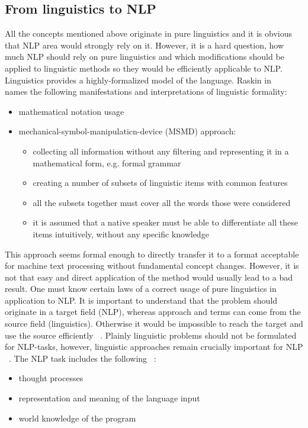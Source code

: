 \subsection{From linguistics to NLP}


All the concepts mentioned above originate in pure linguistics and it is obvious that NLP area would strongly rely on it. However, it is a hard question, how much NLP should rely on pure linguistics and which modifications should be applied to linguistic methods so they would be efficiently applicable to NLP. Linguistics provides a highly-formalized model of the language. Raskin in ~\cite{Raskin} names the following manifestations and interpretations of linguistic formality:

\begin{itemize}
\item mathematical notation usage
\item mechanical-symbol-manipulaticn-device (MSMD) approach:
\begin{itemize}
\item collecting all information without any filtering and representing it in a mathematical form, e.g. formal grammar
\item creating a number of subsets of linguistic items with common features
\item all the subsets together must cover all the words those were considered
\item it is assumed that a native speaker must be able to differentiate all these items intuitively, without any specific knowledge
\end{itemize}
\end{itemize}

This approach seems formal enough to directly transfer it to a format acceptable for machine text processing without fundamental concept changes. However, it is not that easy and direct application of the method would usually lead to a bad result. One must know certain laws of a correct usage of pure linguistics in application to NLP. It is important to understand that the problem should originate in a target field (NLP), whereas approach and terms can come from the source field (linguistics). Otherwise it would be impossible to reach the target and use the source efficiently ~\cite{Raskin}. Plainly linguistic problems should not be formulated for NLP-tasks, however, linguistic approaches remain crucially important for NLP ~\cite{Steedman}. The NLP task includes the following ~\cite{Chowdhury}: 
\begin{itemize}
\item thought processes
\item representation and meaning of the language input
\item world knowledge of the program
\end{itemize}

